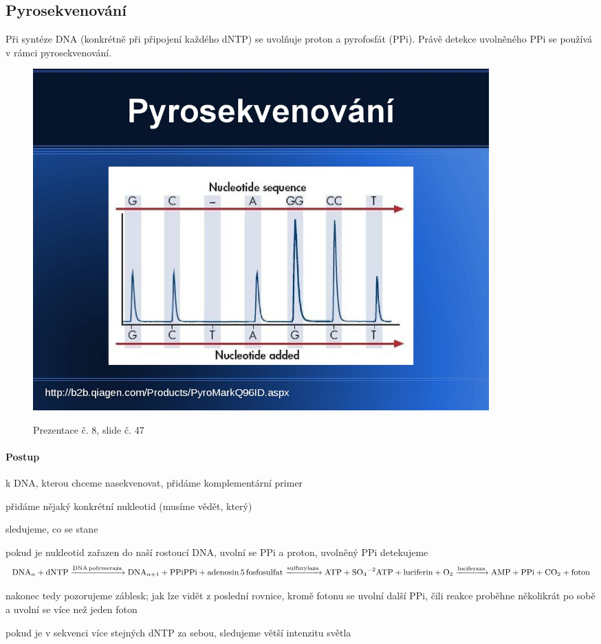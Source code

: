 \documentclass[DIV=8]{scrreprt}
\begin{document}
\subsection{Pyrosekvenování} \label{Pyrosekvenování}


Při syntéze DNA (konkrétně při připojení každého dNTP) se uvolňuje proton a pyrofosfát (PPi). Právě detekce uvolněného PPi se používá v rámci pyrosekvenování.

\begin{figure}
    \caption{Prezentace č. 8, slide č. 47}
    \includegraphics[width=0.85\textwidth]{slides-8/slide-47.jpg}
    \centering
    \label{slides-8-slide-47}
\end{figure}

\paragraph{Postup}
\begin{myEnumerate}[nosep]
    \item k DNA, kterou chceme nasekvenovat, přidáme komplementární primer
    \item přidáme nějaký konkrétní nukleotid (musíme vědět, který)
    \item sledujeme, co se stane
\begin{myItemize}[nosep]
    \item pokud je nukleotid zařazen do naší rostoucí DNA, uvolní se PPi a proton, uvolněný PPi detekujeme
            \[\ce{DNA_n + {dNTP} ->[DNA polymeraza] DNA_{n + 1} + PPi} \\
\ce{PPi + adenosin 5 fosfosulfat ->[sulfurylaza] ATP + SO4^{-2}} \\
\ce{ATP + luciferin + O2 ->[luciferaza] AMP + PPi + CO2 + foton}\]
    \item nakonec tedy pozorujeme záblesk; jak lze vidět z poslední rovnice, kromě fotonu se uvolní další PPi, čili reakce proběhne několikrát po sobě a uvolní se více než jeden foton
    \item pokud je v sekvenci více stejných dNTP za sebou, sledujeme větší intenzitu světla
\end{myItemize}

\end{myEnumerate}
\end{document}
